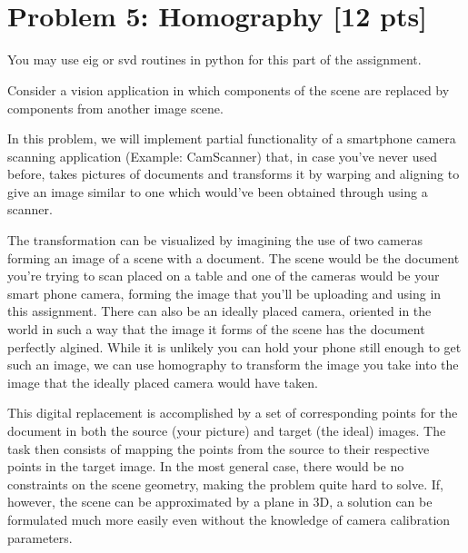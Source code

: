 \documentclass[11pt]{article}
\begin{document}
    \begin{center}
    \end{center}
    { \hspace*{\fill} \\}
    
    \begin{center}
    \end{center}
    { \hspace*{\fill} \\}
    
    \section{Problem 5: Homography {[}12
pts{]}}\label{problem-5-homography-12-pts}

You may use eig or svd routines in python for this part of the
assignment.

Consider a vision application in which components of the scene are
replaced by components from another image scene.

In this problem, we will implement partial functionality of a smartphone
camera scanning application (Example: CamScanner) that, in case you've
never used before, takes pictures of documents and transforms it by
warping and aligning to give an image similar to one which would've been
obtained through using a scanner.

The transformation can be visualized by imagining the use of two cameras
forming an image of a scene with a document. The scene would be the
document you're trying to scan placed on a table and one of the cameras
would be your smart phone camera, forming the image that you'll be
uploading and using in this assignment. There can also be an ideally
placed camera, oriented in the world in such a way that the image it
forms of the scene has the document perfectly algined. While it is
unlikely you can hold your phone still enough to get such an image, we
can use homography to transform the image you take into the image that
the ideally placed camera would have taken.

This digital replacement is accomplished by a set of corresponding
points for the document in both the source (your picture) and target
(the ideal) images. The task then consists of mapping the points from
the source to their respective points in the target image. In the most
general case, there would be no constraints on the scene geometry,
making the problem quite hard to solve. If, however, the scene can be
approximated by a plane in 3D, a solution can be formulated much more
easily even without the knowledge of camera calibration parameters.
\end{document}
